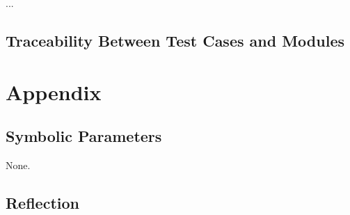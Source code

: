 \documentclass[12pt, titlepage]{article}
\begin{document}
...

\subsection{Traceability Between Test Cases and Modules}

				




\newpage

\section{Appendix}

\subsection{Symbolic Parameters}

None.

\subsection{Reflection}
\end{document}
